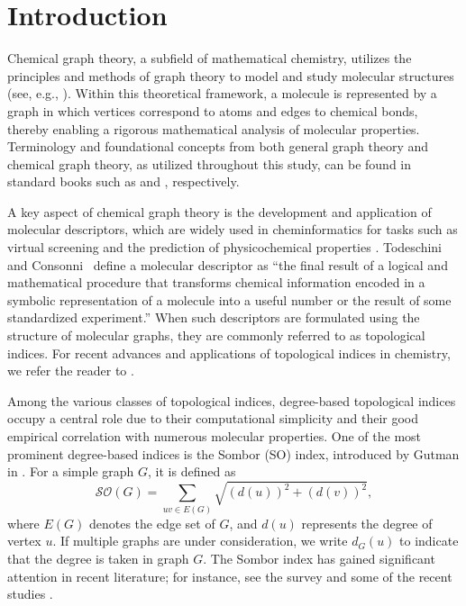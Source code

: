 \documentclass[12pt,a4paper]{article}
\begin{document}
\baselineskip=0.30in



\section{Introduction}

Chemical graph theory, a subfield of mathematical chemistry, utilizes the principles and methods of graph theory to model and study molecular structures (see, e.g., \cite{Leite-24,Wagner-18,Trina-book}). Within this theoretical framework, a molecule is represented by a graph in which vertices correspond to atoms and edges to chemical bonds, thereby enabling a rigorous mathematical analysis of molecular properties. Terminology and foundational concepts from both general graph theory and chemical graph theory, as utilized throughout this study, can be found in standard books such as \cite{Bondy-book,Chartrand-16} and \cite{Wagner-18,Trina-book}, respectively.

A key aspect of chemical graph theory is the development and application of molecular descriptors, which are widely used in cheminformatics for tasks such as virtual screening and the prediction of physicochemical properties \cite{Basak-book}. Todeschini and Consonni~\cite{Todeschini-20-book} define a molecular descriptor as ``the final result of a logical and mathematical procedure that transforms chemical information encoded in a symbolic representation of a molecule into a useful number or the result of some standardized experiment.'' When such descriptors are formulated using the structure of molecular graphs, they are commonly referred to as topological indices. For recent advances and applications of topological indices in chemistry, we refer the reader to \cite{Desmecht-JCIM-24,Leite-24}.



Among the various classes of topological indices, degree-based topological indices \cite{KD1,gut04,gutman13degree,borovicanin17zagreb,Ali-IJACM-17,Ali-IJQC-17,nithyaa24} occupy a central role due to their computational simplicity and their good empirical correlation with numerous molecular properties.  One of the most prominent degree-based indices is the Sombor (SO) index, introduced by Gutman in \cite{gutman21geo}. For a simple graph $G$, it is defined as
\[
\mathcal{SO}(G) = \sum_{uv \in E(G)} \sqrt{(d(u))^2 + (d(v))^2},
\]
where $E(G)$ denotes the edge set of $G$, and $d(u)$ represents the degree of vertex $u$. If multiple graphs are under consideration, we write $d_G(u)$ to indicate that the degree is taken in graph $G$. The Sombor index has gained significant attention in recent literature; for instance, see the survey \cite{liu22review} and some of the recent studies \cite{chen24,das24open,new2,new3,new11}.
\end{document}

